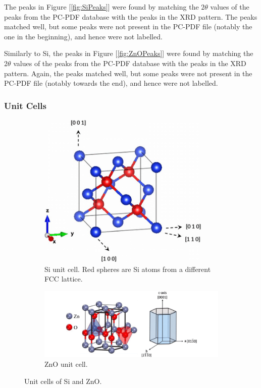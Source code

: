 \documentclass{article}
\begin{document}
The peaks in Figure [\ref{fig:SiPeaks}] were found by matching the $ 2 \theta $ values of the peaks from the PC-PDF database with the peaks in the XRD pattern. 
The peaks matched well, but some peaks were not present in the PC-PDF file (notably the one in the beginning), and hence were not labelled.


	Similarly to Si, the peaks in Figure [\ref{fig:ZnOPeaks}] were found by matching the $ 2 \theta $ values of the peaks from the PC-PDF database with the peaks in the XRD pattern. 
Again, the peaks matched well, but some peaks were not present in the PC-PDF file (notably towards the end), and hence were not labelled.

\pagebreak{}

\subsubsection{Unit Cells}

\begin{figure}[h]
	\centering
	\begin {subfigure}{0.35\textwidth}
		\centering
		\includegraphics[width=0.9\textwidth]{Figures/SiUnitCell.png}
		\caption{Si unit cell. Red spheres are Si atoms from a different FCC lattice. \cite{samadi_2019_design}}
		\label{fig:SiUnitCell}
	\end{subfigure}
	\hfill
	\begin {subfigure}{0.6\textwidth}
		\centering
		\includegraphics[width=\textwidth]{Figures/ZnOUnitCell.png}
		\caption{ZnO unit cell. \cite{urata_2016_higher}}
		\label{fig:ZnOUnitCell}
	\end{subfigure}
	\caption{Unit cells of Si and ZnO.}
	\label{fig:UnitCells}
\end{figure}
\end{document}
